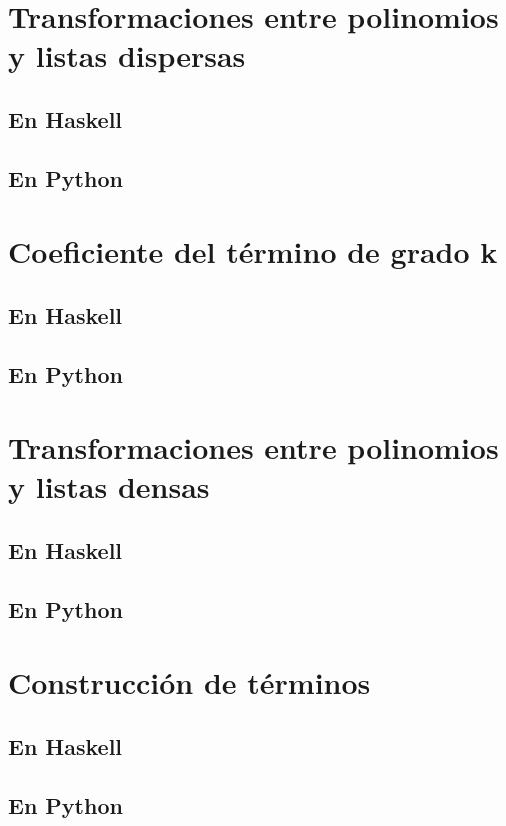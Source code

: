 \documentclass[a4paper,12pt,twoside]{book}
\begin{document}
\section{Transformaciones entre polinomios y listas dispersas}
\subsection{En Haskell}
\subsection{En Python}

\section{Coeficiente del término de grado k}
\subsection{En Haskell}
\subsection{En Python}

\section{Transformaciones entre polinomios y listas densas}
\subsection{En Haskell}
\subsection{En Python}

\section{Construcción de términos}
\subsection{En Haskell}
\subsection{En Python}
\end{document}
